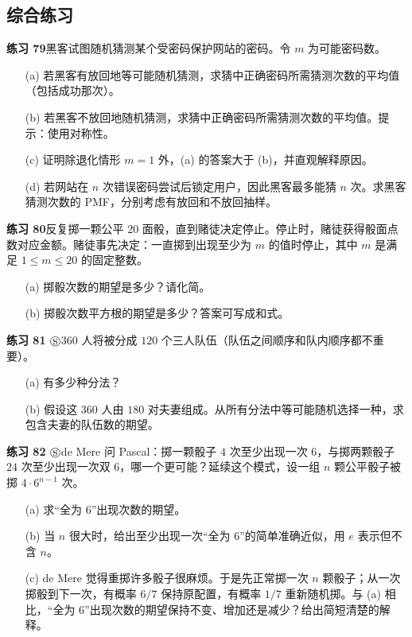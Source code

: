 \documentclass[UTF8,12pt,a4paper,fontset=fandol]{ctexart}
\begin{document}
\subsection*{综合练习}

\noindent\textbf{练习 79}\quad 黑客试图随机猜测某个受密码保护网站的密码。令 $m$ 为可能密码数。
\begin{enumerate}
  \item[(a)] 若黑客有放回地等可能随机猜测，求猜中正确密码所需猜测次数的平均值（包括成功那次）。
  \item[(b)] 若黑客不放回地随机猜测，求猜中正确密码所需猜测次数的平均值。提示：使用对称性。
  \item[(c)] 证明除退化情形 $m=1$ 外，(a) 的答案大于 (b)，并直观解释原因。
  \item[(d)] 若网站在 $n$ 次错误密码尝试后锁定用户，因此黑客最多能猜 $n$ 次。求黑客猜测次数的 PMF，分别考虑有放回和不放回抽样。
\end{enumerate}

\noindent\textbf{练习 80}\quad 反复掷一颗公平 $20$ 面骰，直到赌徒决定停止。停止时，赌徒获得骰面点数对应金额。赌徒事先决定：一直掷到出现至少为 $m$ 的值时停止，其中 $m$ 是满足 $1\le m\le20$ 的固定整数。
\begin{enumerate}
  \item[(a)] 掷骰次数的期望是多少？请化简。
  \item[(b)] 掷骰次数平方根的期望是多少？答案可写成和式。
\end{enumerate}

\noindent\textbf{练习 81 $\circledS$}\quad $360$ 人将被分成 $120$ 个三人队伍（队伍之间顺序和队内顺序都不重要）。
\begin{enumerate}
  \item[(a)] 有多少种分法？
  \item[(b)] 假设这 $360$ 人由 $180$ 对夫妻组成。从所有分法中等可能随机选择一种，求包含夫妻的队伍数的期望。
\end{enumerate}

\noindent\textbf{练习 82 $\circledS$}\quad de Mere 问 Pascal：掷一颗骰子 $4$ 次至少出现一次 $6$，与掷两颗骰子 $24$ 次至少出现一次双 $6$，哪一个更可能？延续这个模式，设一组 $n$ 颗公平骰子被掷 $4\cdot 6^{n-1}$ 次。
\begin{enumerate}
  \item[(a)] 求“全为 $6$”出现次数的期望。
  \item[(b)] 当 $n$ 很大时，给出至少出现一次“全为 $6$”的简单准确近似，用 $e$ 表示但不含 $n$。
  \item[(c)] de Mere 觉得重掷许多骰子很麻烦。于是先正常掷一次 $n$ 颗骰子；从一次掷骰到下一次，有概率 $6/7$ 保持原配置，有概率 $1/7$ 重新随机掷。与 (a) 相比，“全为 $6$”出现次数的期望保持不变、增加还是减少？给出简短清楚的解释。
\end{enumerate}
\end{document}
